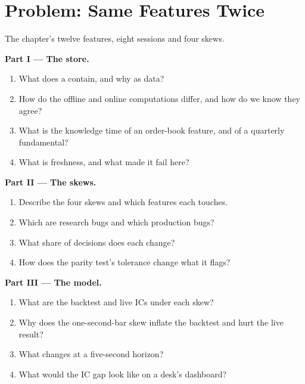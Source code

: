 \section{Problem: Same Features Twice}

\begin{problem}\label{pb:ml:data-and-feature-stores:1}
The chapter's twelve features, eight sessions and four skews.

\medskip\noindent\textbf{Part I --- The store.}
\begin{enumerate}
\item What does a  contain, and why as data?
\item How do the offline and online computations differ, and how do we know they agree?
\item What is the knowledge time of an order-book feature, and of a quarterly fundamental?
\item What is freshness, and what made it fail here?
\end{enumerate}

\medskip\noindent\textbf{Part II --- The skews.}
\begin{enumerate}[resume]
\item Describe the four skews and which features each touches.
\item Which are research bugs and which production bugs?
\item What share of decisions does each change?
\item How does the parity test's tolerance change what it flags?
\end{enumerate}

\medskip\noindent\textbf{Part III --- The model.}
\begin{enumerate}[resume]
\item What are the backtest and live ICs under each skew?
\item Why does the one-second-bar skew inflate the backtest and hurt the live result?
\item What changes at a five-second horizon?
\item What would the IC gap look like on a desk's dashboard?
\end{enumerate}


\end{problem}
